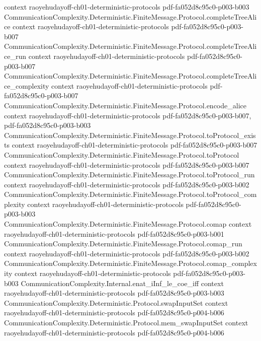 \begin{lemma}
  {context}
  {raoyehudayoff-ch01-deterministic-protocols}
  {pdf-fa052d8c95c0-p003-b003}
\proofstep
  {CommunicationComplexity.Deterministic.FiniteMessage.Protocol.completeTreeAlice}
  {context}
  {raoyehudayoff-ch01-deterministic-protocols}
  {pdf-fa052d8c95c0-p003-b007}
\proofstep
  {CommunicationComplexity.Deterministic.FiniteMessage.Protocol.completeTreeAlice_run}
  {context}
  {raoyehudayoff-ch01-deterministic-protocols}
  {pdf-fa052d8c95c0-p003-b007}
\proofstep
  {CommunicationComplexity.Deterministic.FiniteMessage.Protocol.completeTreeAlice_complexity}
  {context}
  {raoyehudayoff-ch01-deterministic-protocols}
  {pdf-fa052d8c95c0-p003-b007}
\proofstep
  {CommunicationComplexity.Deterministic.FiniteMessage.Protocol.encode_alice}
  {context}
  {raoyehudayoff-ch01-deterministic-protocols}
  {pdf-fa052d8c95c0-p003-b007,
    pdf-fa052d8c95c0-p003-b003}
\proofstep
  {CommunicationComplexity.Deterministic.FiniteMessage.Protocol.toProtocol_exists}
  {context}
  {raoyehudayoff-ch01-deterministic-protocols}
  {pdf-fa052d8c95c0-p003-b007}
\proofstep
  {CommunicationComplexity.Deterministic.FiniteMessage.Protocol.toProtocol}
  {context}
  {raoyehudayoff-ch01-deterministic-protocols}
  {pdf-fa052d8c95c0-p003-b007}
\proofstep
  {CommunicationComplexity.Deterministic.FiniteMessage.Protocol.toProtocol_run}
  {context}
  {raoyehudayoff-ch01-deterministic-protocols}
  {pdf-fa052d8c95c0-p003-b002}
\proofstep
  {CommunicationComplexity.Deterministic.FiniteMessage.Protocol.toProtocol_complexity}
  {context}
  {raoyehudayoff-ch01-deterministic-protocols}
  {pdf-fa052d8c95c0-p003-b003}
\proofstep
  {CommunicationComplexity.Deterministic.FiniteMessage.Protocol.comap}
  {context}
  {raoyehudayoff-ch01-deterministic-protocols}
  {pdf-fa052d8c95c0-p003-b001}
\proofstep
  {CommunicationComplexity.Deterministic.FiniteMessage.Protocol.comap_run}
  {context}
  {raoyehudayoff-ch01-deterministic-protocols}
  {pdf-fa052d8c95c0-p003-b002}
\proofstep
  {CommunicationComplexity.Deterministic.FiniteMessage.Protocol.comap_complexity}
  {context}
  {raoyehudayoff-ch01-deterministic-protocols}
  {pdf-fa052d8c95c0-p003-b003}
\proofstep
  {CommunicationComplexity.Internal.enat_iInf_le_coe_iff}
  {context}
  {raoyehudayoff-ch01-deterministic-protocols}
  {pdf-fa052d8c95c0-p003-b003}
\proofstep
  {CommunicationComplexity.Deterministic.Protocol.swapInputSet}
  {context}
  {raoyehudayoff-ch01-deterministic-protocols}
  {pdf-fa052d8c95c0-p004-b006}
\proofstep
  {CommunicationComplexity.Deterministic.Protocol.mem_swapInputSet}
  {context}
  {raoyehudayoff-ch01-deterministic-protocols}
  {pdf-fa052d8c95c0-p004-b006}

\end{lemma}
